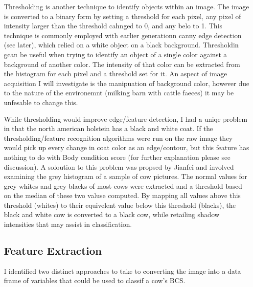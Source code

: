 \documentclass[11pt]{article}
\begin{document}
	Thresholding is another technique to identify objects within an image.
	The image is converted to a binary form by setting a threshold for each pixel, any pixel of intensity larger than the threshold cahnged to 0, and any belo to 1. 
	This technique is commonly employed with earlier generationn canny edge detection (see later), which relied on a white object on a black background.
	Thresholdin gcan be useful when trying to identify an object of a single color against a background of another color. 
	The intensity of that color can be extracted from the histogram for each pixel and a threshold set for it.
	An aspect of image acquisition I will investigate is the manipuation of background color, however due to the nature of the environemnt (milking barn with cattle faeces) it may be unfesable to change this.


	While thresholding would improve edge/feature detection, I had a uniqe problem in that the north american holstein has a black and white coat.
	If the thresholding/feature recognition algorithms were run on the raw image they would pick up every change in coat color as an edge/contour, but this feature has nothing to do with Body condition score (for further explanation please see discussion).
 	A soloution to this problem was propsed by Jianfei \cite{Jianfei2011} and involved examining the grey histogram of a sample of cow pictures.
	The normal values for grey whites and grey blacks of most cows were extracted and a threshold based on the median of these two valuse computed.
	By mapping all values above this threshold (whites) to their equivelent value below this threshold (blacks), the black and white cow is converted to a black cow, while retailing shadow intensities that may assist in classification.
\newpage
\subsection{Feature Extraction}


	I identified two distinct approaches to take to converting the image into a data frame of variables that could be used to classif a cow's BCS.
\end{document}
